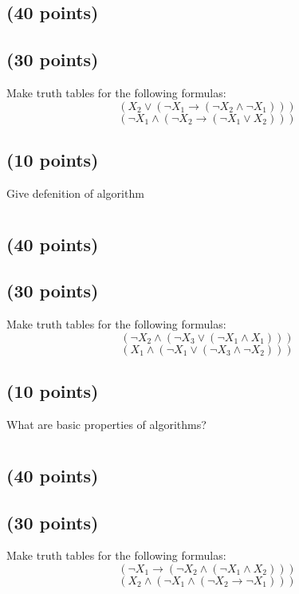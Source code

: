 \documentclass[a4paper,10pt]{article}
\begin{document}
\subsection{(40 points)}


\subsection{(30 points)}
 Make truth tables for the following formulas:
\[
(X_{2} \vee (\neg X_{1} \rightarrow (\neg X_{2} \wedge \neg X_{1})))
\]
\[
(\neg X_{1} \wedge (\neg X_{2} \rightarrow (\neg X_{1} \vee X_{2})))
\]

\subsection{(10 points)}
Give defenition of algorithm

\newpage

\section{}
\subsection{(40 points)}


\subsection{(30 points)}
 Make truth tables for the following formulas:
\[
(\neg X_{2} \wedge (\neg X_{3} \vee (\neg X_{1} \wedge X_{1})))
\]
\[
(X_{1} \wedge (\neg X_{1} \vee (\neg X_{3} \wedge \neg X_{2})))
\]

\subsection{(10 points)}
What are basic properties of algorithms?

\newpage

\section{}
\subsection{(40 points)}


\subsection{(30 points)}
 Make truth tables for the following formulas:
\[
(\neg X_{1} \rightarrow (\neg X_{2} \wedge (\neg X_{1} \wedge X_{2})))
\]
\[
(X_{2} \wedge (\neg X_{1} \wedge (\neg X_{2} \rightarrow \neg X_{1})))
\]
\end{document}
